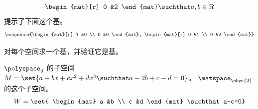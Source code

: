 \begin{exercises}
\begin{answer}
\begin{exparts}
\begin{equation*}
{\begin{mat}[r]
                           0  &2
                          \end{mat} \suchthat a,b\in\Re}
            \end{equation*}
            提示了下面这个基。
            \begin{equation*}
              \sequence{\begin{mat}[r]
                          1  &0  \\
                          0  &0
                        \end{mat},
                        \begin{mat}[r]
                          0  &1  \\
                          0  &2
                        \end{mat}}
            \end{equation*}
         \end{exparts}
      \end{answer}
  \item 对每个空间求一个基，并验证它是基。
    \begin{exparts}
      \partsitem
        $\polyspace_3$ 的子空间
        $M=\set{a+bx+cx^2+dx^3\suchthat a-2b+c-d=0}$。
      \partsitem  $\matspace_{\nbyn{2}}$ 的这个子空间。
         \begin{equation*}
           W=\set{
             \begin{mat}
               a  &b  \\
               c  &d
             \end{mat}
             \suchthat a-c=0}
         \end{equation*}


\end{exparts}
\end{exercises}
